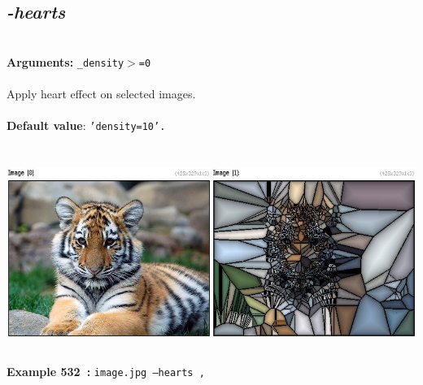 \documentclass[a4paper,11pt,twoside]{book}
\begin{document}
\subsection{\emph{-hearts} }\vspace*{-0.5em}
~\\\textbf{Arguments: } 
{\small \texttt{\_density$>$=0}}\\~\\
Apply heart effect on selected images.
~\\~\\\textbf{Default value}: {\small \texttt{'density=10'.}}
\begin{center}\includegraphics[keepaspectratio=true,height=7cm,width=\textwidth]{img/gmic_def532.jpg}\\
{\footnotesize \textbf{Example 532~:} \texttt{image.jpg --hearts ,}}
\end{center}
\end{document}
